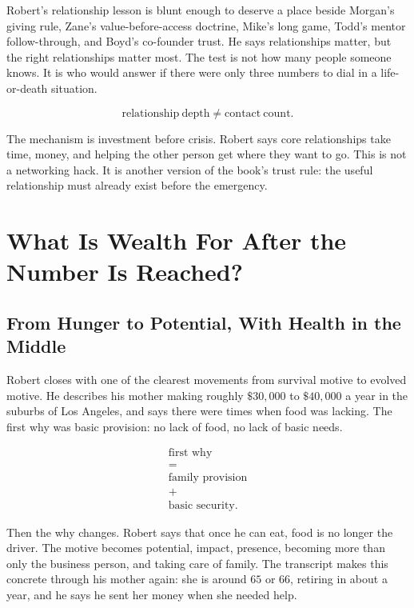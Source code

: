 \documentclass[11pt,oneside]{book}
\begin{document}
Robert's relationship lesson is blunt enough to deserve a place beside Morgan's giving rule, Zane's value-before-access doctrine, Mike's long game, Todd's mentor follow-through, and Boyd's co-founder trust. He says relationships matter, but the right relationships matter most. The test is not how many people someone knows. It is who would answer if there were only three numbers to dial in a life-or-death situation.

\begin{equation}
\mathrm{relationship\ depth}
\neq
\mathrm{contact\ count}.
\end{equation}

The mechanism is investment before crisis. Robert says core relationships take time, money, and helping the other person get where they want to go. This is not a networking hack. It is another version of the book's trust rule: the useful relationship must already exist before the emergency.

\chapter{What Is Wealth For After the Number Is Reached?}

\section{From Hunger to Potential, With Health in the Middle}

Robert closes with one of the clearest movements from survival motive to evolved motive. He describes his mother making roughly \(\$30{,}000\) to \(\$40{,}000\) a year in the suburbs of Los Angeles, and says there were times when food was lacking. The first why was basic provision: no lack of food, no lack of basic needs.

\begin{equation}
\begin{gathered}
\text{first why}\\
=\\
\text{family provision}\\
+\\
\text{basic security}.
\end{gathered}
\end{equation}

Then the why changes. Robert says that once he can eat, food is no longer the driver. The motive becomes potential, impact, presence, becoming more than only the business person, and taking care of family. The transcript makes this concrete through his mother again: she is around \(65\) or \(66\), retiring in about a year, and he says he sent her money when she needed help.
\end{document}
